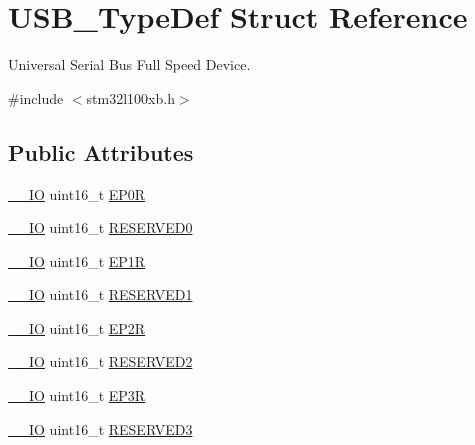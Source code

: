 \hypertarget{struct_u_s_b___type_def}{\section{U\-S\-B\-\_\-\-Type\-Def Struct Reference}
\label{struct_u_s_b___type_def}
}


Universal Serial Bus Full Speed Device.  




{\ttfamily \#include $<$stm32l100xb.\-h$>$}

\subsection*{Public Attributes}
\begin{DoxyCompactItemize}
\item 
\hyperlink{core__sc300_8h_aec43007d9998a0a0e01faede4133d6be}{\-\_\-\-\_\-\-I\-O} uint16\-\_\-t \hyperlink{struct_u_s_b___type_def_ac9558c2899f9540e56c8cfbca2fb3ff1}{E\-P0\-R}
\item 
\hyperlink{core__sc300_8h_aec43007d9998a0a0e01faede4133d6be}{\-\_\-\-\_\-\-I\-O} uint16\-\_\-t \hyperlink{struct_u_s_b___type_def_abaadc15d64249004eafbed98f8d9236c}{R\-E\-S\-E\-R\-V\-E\-D0}
\item 
\hyperlink{core__sc300_8h_aec43007d9998a0a0e01faede4133d6be}{\-\_\-\-\_\-\-I\-O} uint16\-\_\-t \hyperlink{struct_u_s_b___type_def_a46ff092e0d02d59a9cccb770944953c4}{E\-P1\-R}
\item 
\hyperlink{core__sc300_8h_aec43007d9998a0a0e01faede4133d6be}{\-\_\-\-\_\-\-I\-O} uint16\-\_\-t \hyperlink{struct_u_s_b___type_def_a4d2d3515b92eb74072bb91990542dcb3}{R\-E\-S\-E\-R\-V\-E\-D1}
\item 
\hyperlink{core__sc300_8h_aec43007d9998a0a0e01faede4133d6be}{\-\_\-\-\_\-\-I\-O} uint16\-\_\-t \hyperlink{struct_u_s_b___type_def_a4cc338562401a6c35c89bd9ab99156c2}{E\-P2\-R}
\item 
\hyperlink{core__sc300_8h_aec43007d9998a0a0e01faede4133d6be}{\-\_\-\-\_\-\-I\-O} uint16\-\_\-t \hyperlink{struct_u_s_b___type_def_a5e7bbbb02a304e95db0f47927613aecc}{R\-E\-S\-E\-R\-V\-E\-D2}
\item 
\hyperlink{core__sc300_8h_aec43007d9998a0a0e01faede4133d6be}{\-\_\-\-\_\-\-I\-O} uint16\-\_\-t \hyperlink{struct_u_s_b___type_def_a67c8085fd9ff7b534fb6a09ab6205012}{E\-P3\-R}
\item 
\hyperlink{core__sc300_8h_aec43007d9998a0a0e01faede4133d6be}{\-\_\-\-\_\-\-I\-O} uint16\-\_\-t \hyperlink{struct_u_s_b___type_def_a0c92b14da7ba0df757ff11ff20e1bc6a}{R\-E\-S\-E\-R\-V\-E\-D3}

\end{DoxyCompactItemize}

